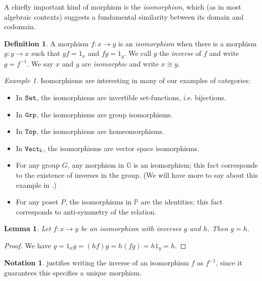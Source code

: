 \documentclass[11 pt]{amsart}
\theoremstyle{plain}   %
\newtheorem{lemma}{Lemma}[section]
\theoremstyle{definition}
\newtheorem{defn}{Definition}[section]
\newtheorem{notn}{Notation}[section]
\theoremstyle{remark}
\newtheorem{ex}{Example}[section]
\numberwithin{equation}{section}
\def\GG{\mathbb{G}}
\def\PP{\mathbb{P}}
\newcommand{\cat}[1]{{\normalfont\texttt{#1}}}
\begin{document}
A chiefly important kind of morphism is the \emph{isomorphism}, which (as in
most algebraic contexts) suggests a fundamental similarity between its domain and
codomain.

\begin{defn}
	A morphism $f: x\rightarrow y$ is an \emph{isomorphism} when there is a morphism
	$g: y\rightarrow x$ such that $gf = 1_x$ and $fg = 1_y$. We call $g$ the
	\emph{inverse} of $f$ and write $g = f^{-1}$. We say $x$ and $y$ are
	\emph{isomorphic} and write $x\cong y$.
\end{defn}

\begin{ex}\label{isomorphisms} Isomorphisms are interesting in many of our examples of categories:
	\begin{itemize}
		\item In $\cat{Set}$, the isomorphisms are invertible set-functions, i.e. bijections.
		\item In $\cat{Grp}$, the isomorphisms are group isomorphisms.
		\item In $\cat{Top}$, the isomorphisms are homeomorphisms.
		\item In $\cat{Vect}_{\Bbbk}$, the isomorphisms are vector space isomorphisms.
		\item For any group $G$, any morphism in $\GG$ is an isomorphism;
		      this fact corresponds to the existence of inverses in the group. (We
		      will have more to say about this example in .)
		\item For any poset $P$, the isomorphisms in $\PP$ are the identities;
		      this fact corresponds to anti-symmetry of the relation.
	\end{itemize}
\end{ex}

\begin{lemma}\label{inverses are unique}
	Let $f: x\rightarrow y$ be an isomorphism with inverses $g$ and $h$. Then $g = h$.
\end{lemma}

\begin{proof}
	We have $g = 1_xg = (hf)g = h(fg) = h1_y = h.$
\end{proof}

\begin{notn}
	 justifies writing the inverse of an isomorphism $f$
	as $f^{-1}$, since it guarantees this specifies a unique morphism.
\end{notn}
\end{document}
